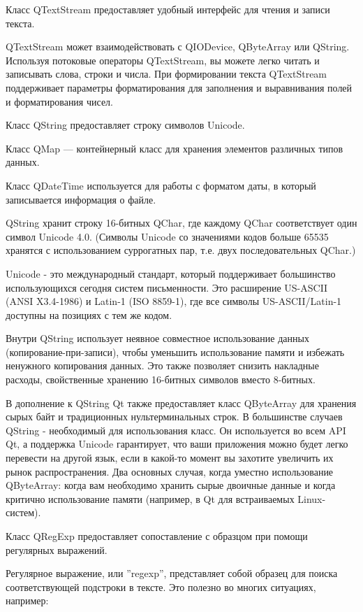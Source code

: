 Класс QTextStream предоставляет удобный интерфейс для чтения и записи текста.

QTextStream может взаимодействовать с QIODevice, QByteArray или QString. Используя потоковые операторы QTextStream, вы можете легко читать и записывать слова, строки и числа. При формировании текста QTextStream поддерживает параметры форматирования для заполнения и выравнивания полей и форматирования чисел. \cite{qtdoc}

Класс QString предоставляет строку символов Unicode.

Класс QMap --- контейнерный класс для хранения элементов различных типов данных.

Класс QDateTime используется для работы с форматом даты, в который записывается информация о файле.

QString хранит строку 16-битных QChar, где каждому QChar соответствует один символ Unicode 4.0. (Символы Unicode со значениями кодов больше 65535 хранятся с использованием суррогатных пар, т.е. двух последовательных QChar.)

Unicode - это международный стандарт, который поддерживает большинство использующихся сегодня систем письменности. Это расширение US-ASCII (ANSI X3.4-1986) и Latin-1 (ISO 8859-1), где все символы US-ASCII/Latin-1 доступны на позициях с тем же кодом.

Внутри QString использует неявное совместное использование данных (копирование-при-записи), чтобы уменьшить использование памяти и избежать ненужного копирования данных. Это также позволяет снизить накладные расходы, свойственные хранению 16-битных символов вместо 8-битных.

В дополнение к QString Qt также предоставляет класс QByteArray для хранения сырых байт и традиционных нультерминальных строк. В большинстве случаев QString - необходимый для использования класс. Он используется во всем API Qt, а поддержка Unicode гарантирует, что ваши приложения можно будет легко перевести на другой язык, если в какой-то момент вы захотите увеличить их рынок распространения. Два основных случая, когда уместно использование QByteArray: когда вам необходимо хранить сырые двоичные данные и когда критично использование памяти (например, в Qt для встраиваемых Linux-систем). \cite{qtcross}

Класс QRegExp предоставляет сопоставление с образцом при помощи регулярных выражений.

Регулярное выражение, или ''regexp'', представляет собой образец для поиска соответствующей подстроки в тексте. Это полезно во многих ситуациях, например:

